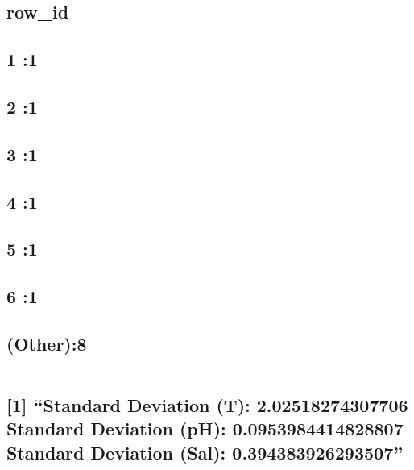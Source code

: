 \documentclass[
]{article}
\begin{document}
\hypertarget{section-22}{%
\subsection{}\label{section-22}}

\hypertarget{row_id}{%
\subsection{row\_id}\label{row_id}}

\hypertarget{section-23}{%
\subsection{1 :1}\label{section-23}}

\hypertarget{section-24}{%
\subsection{2 :1}\label{section-24}}

\hypertarget{section-25}{%
\subsection{3 :1}\label{section-25}}

\hypertarget{section-26}{%
\subsection{4 :1}\label{section-26}}

\hypertarget{section-27}{%
\subsection{5 :1}\label{section-27}}

\hypertarget{section-28}{%
\subsection{6 :1}\label{section-28}}

\hypertarget{other8}{%
\subsection{(Other):8}\label{other8}}

\begin{verbatim}
\end{verbatim}

\hypertarget{standard-deviation-t-2.02518274307706-standard-deviation-ph-0.0953984414828807-standard-deviation-sal-0.394383926293507}{%
\subsection{{[}1{]} ``Standard Deviation (T): 2.02518274307706 Standard
Deviation (pH): 0.0953984414828807 Standard Deviation (Sal):
0.394383926293507''}\label{standard-deviation-t-2.02518274307706-standard-deviation-ph-0.0953984414828807-standard-deviation-sal-0.394383926293507}}
\end{document}
